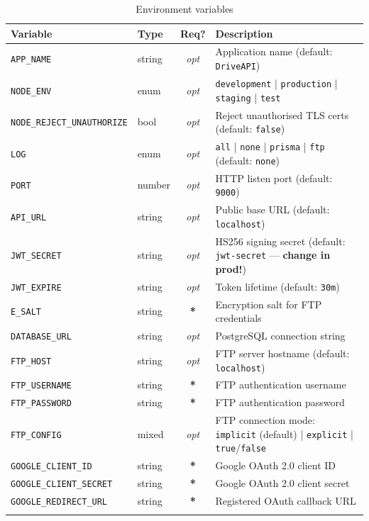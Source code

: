 \documentclass[12pt,a4paper]{article}
\newcommand{\required}{\textcolor{danger}{\textbf{*}}}
\newcommand{\optional}{\textcolor{muted}{\textit{opt}}}
\begin{document}
\begin{longtable}{llcE}
\toprule
\textbf{Variable} & \textbf{Type} & \textbf{Req?} & \textbf{Description} \\
\midrule
\texttt{APP\_NAME}                & string  & \optional & Application name (default: \texttt{DriveAPI}) \\
\texttt{NODE\_ENV}                & enum    & \optional & \texttt{development} | \texttt{production} | \texttt{staging} | \texttt{test} \\
\texttt{NODE\_REJECT\_UNAUTHORIZE}& bool    & \optional & Reject unauthorised TLS certs (default: \texttt{false}) \\
\texttt{LOG}                      & enum    & \optional & \texttt{all} | \texttt{none} | \texttt{prisma} | \texttt{ftp} (default: \texttt{none}) \\
\texttt{PORT}                     & number  & \optional & HTTP listen port (default: \texttt{9000}) \\
\texttt{API\_URL}                 & string  & \optional & Public base URL (default: \texttt{localhost}) \\
\texttt{JWT\_SECRET}              & string  & \optional & HS256 signing secret (default: \texttt{jwt-secret} — \textbf{change in prod!}) \\
\texttt{JWT\_EXPIRE}              & string  & \optional & Token lifetime (default: \texttt{30m}) \\
\texttt{E\_SALT}                  & string  & \required & Encryption salt for FTP credentials \\
\texttt{DATABASE\_URL}            & string  & \optional & PostgreSQL connection string \\
\texttt{FTP\_HOST}                & string  & \optional & FTP server hostname (default: \texttt{localhost}) \\
\texttt{FTP\_USERNAME}            & string  & \required & FTP authentication username \\
\texttt{FTP\_PASSWORD}            & string  & \required & FTP authentication password \\
\texttt{FTP\_CONFIG}              & mixed   & \optional & FTP connection mode: \texttt{implicit} (default) | \texttt{explicit} | \texttt{true}/\texttt{false} \\
\texttt{GOOGLE\_CLIENT\_ID}       & string  & \required & Google OAuth 2.0 client ID \\
\texttt{GOOGLE\_CLIENT\_SECRET}   & string  & \required & Google OAuth 2.0 client secret \\
\texttt{GOOGLE\_REDIRECT\_URL}    & string  & \required & Registered OAuth callback URL \\
\bottomrule
\caption{Environment variables}
\end{longtable}
\end{document}
